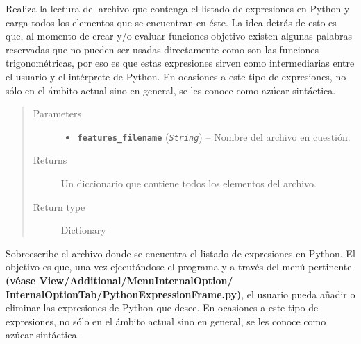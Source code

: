 \documentclass[class=report, crop=false]{standalone}
\begin{document}
\begin{fulllineitems}
\begin{fulllineitems}
\end{fulllineitems}

\begin{fulllineitems}

Realiza la lectura del archivo que contenga el listado de 
expresiones en Python y carga todos los elementos que se 
encuentran en éste.\break
La idea detrás de esto es que, al momento de crear y/o evaluar
funciones objetivo existen algunas palabras reservadas que no pueden 
ser usadas directamente como son las funciones trigonométricas, por eso
es que estas expresiones sirven como intermediarias entre el usuario y
el intérprete de Python.\break
En ocasiones a este tipo de expresiones, no sólo en el ámbito actual
sino en general, se les conoce como azúcar sintáctica.

\begin{quote}\begin{description}
\item[{Parameters}] \leavevmode\begin{itemize}
\item \textbf{\texttt{features\_filename}} (\emph{\texttt{String}}) -- Nombre del archivo en cuestión.
\end{itemize}
\item[{Returns}] \leavevmode
Un diccionario que contiene todos los elementos del archivo.
\item[{Return type}] \leavevmode
Dictionary
\end{description}\end{quote}

\end{fulllineitems}

\begin{fulllineitems}
Sobreescribe el archivo donde se encuentra el listado de expresiones
en Python.\break
El objetivo es que, una vez ejecutándose el programa y a través del menú
pertinente \textbf{(véase View/Additional/MenuInternalOption/}\break
\textbf{InternalOptionTab/PythonExpressionFrame.py)}, el usuario pueda 
añadir o eliminar las expresiones de Python que desee.\break
En ocasiones a este tipo de expresiones, no sólo en el ámbito actual 
sino en general, se les conoce como azúcar sintáctica.


\end{fulllineitems}
\end{fulllineitems}
\end{document}
